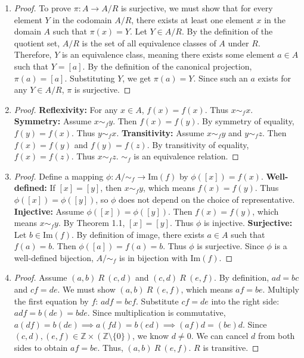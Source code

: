 \documentclass[11pt, a4paper]{article}
\theoremstyle{definition}
\theoremstyle{remark}
\newcommand{\Z}{\mathbb{Z}}
\begin{document}
\begin{enumerate}[label=\textbf{\arabic*.}, leftmargin=*]
    \item \begin{proof}
    To prove $\pi: A \to A/R$ is surjective, we must show that for every element $Y$ in the codomain $A/R$, there exists at least one element $x$ in the domain $A$ such that $\pi(x) = Y$.
    Let $Y \in A/R$. By the definition of the quotient set, $A/R$ is the set of all equivalence classes of $A$ under $R$. Therefore, $Y$ is an equivalence class, meaning there exists some element $a \in A$ such that $Y = [a]$.
    By the definition of the canonical projection, $\pi(a) = [a]$.
    Substituting $Y$, we get $\pi(a) = Y$. Since such an $a$ exists for any $Y \in A/R$, $\pi$ is surjective.
    \end{proof}

    \item \begin{proof}
    \textbf{Reflexivity:} For any $x \in A$, $f(x) = f(x)$. Thus $x \sim_f x$.
    \textbf{Symmetry:} Assume $x \sim_f y$. Then $f(x) = f(y)$. By symmetry of equality, $f(y) = f(x)$. Thus $y \sim_f x$.
    \textbf{Transitivity:} Assume $x \sim_f y$ and $y \sim_f z$. Then $f(x) = f(y)$ and $f(y) = f(z)$. By transitivity of equality, $f(x) = f(z)$. Thus $x \sim_f z$. $\sim_f$ is an equivalence relation.
    \end{proof}

    \item \begin{proof}
    Define a mapping $\phi: A/\sim_f \to \text{Im}(f)$ by $\phi([x]) = f(x)$.
    \textbf{Well-defined:} If $[x] = [y]$, then $x \sim_f y$, which means $f(x) = f(y)$. Thus $\phi([x]) = \phi([y])$, so $\phi$ does not depend on the choice of representative.
    \textbf{Injective:} Assume $\phi([x]) = \phi([y])$. Then $f(x) = f(y)$, which means $x \sim_f y$. By Theorem 1.1, $[x] = [y]$. Thus $\phi$ is injective.
    \textbf{Surjective:} Let $b \in \text{Im}(f)$. By definition of image, there exists $a \in A$ such that $f(a) = b$. Then $\phi([a]) = f(a) = b$. Thus $\phi$ is surjective.
    Since $\phi$ is a well-defined bijection, $A/\sim_f$ is in bijection with $\text{Im}(f)$.
    \end{proof}

    \item \begin{proof}
    Assume $(a, b) \ R \ (c, d)$ and $(c, d) \ R \ (e, f)$. By definition, $ad = bc$ and $cf = de$.
    We must show $(a, b) \ R \ (e, f)$, which means $af = be$.
    Multiply the first equation by $f$: $adf = bcf$.
    Substitute $cf = de$ into the right side: $adf = b(de) = bde$.
    Since multiplication is commutative, $a(df) = b(de) \implies a(fd) = b(ed) \implies (af)d = (be)d$.
    Since $(c, d), (e, f) \in \Z \times (\Z \setminus \{0\})$, we know $d \neq 0$. We can cancel $d$ from both sides to obtain $af = be$.
    Thus, $(a, b) \ R \ (e, f)$. $R$ is transitive.
    \end{proof}


\end{enumerate}
\end{document}
